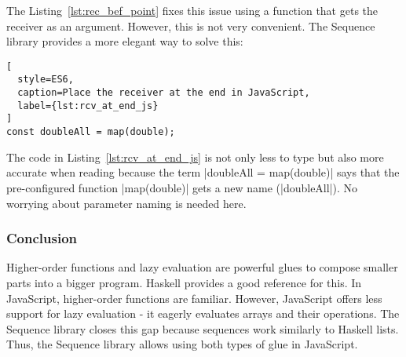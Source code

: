 The Listing~\ref{lst:rec_bef_point} fixes this issue using a function that gets
the receiver as an argument. However, this is not very convenient. The Sequence
library provides a more elegant way to solve this:

\begin{lstlisting}[
  style=ES6,
  caption=Place the receiver at the end in JavaScript,
  label={lst:rcv_at_end_js}
]
const doubleAll = map(double);
\end{lstlisting}

The code in Listing~\ref{lst:rcv_at_end_js} is not only less to type but also
more accurate when reading because the term |doubleAll = map(double)| says that
the pre-configured function |map(double)| gets a new name (|doubleAll|). No worrying about
parameter naming is needed here.
\subsubsection{Conclusion} %
\label{subsub:modularizing_programs_conclusion}
Higher-order functions and lazy evaluation are powerful glues to compose
smaller parts into a bigger program. Haskell provides a good reference for
this. In JavaScript, higher-order functions are familiar. However, JavaScript
offers less support for lazy evaluation - it eagerly evaluates arrays and their
operations. The Sequence library closes this gap because sequences work
similarly to Haskell lists. Thus, the Sequence library allows using both types
of glue in JavaScript.
